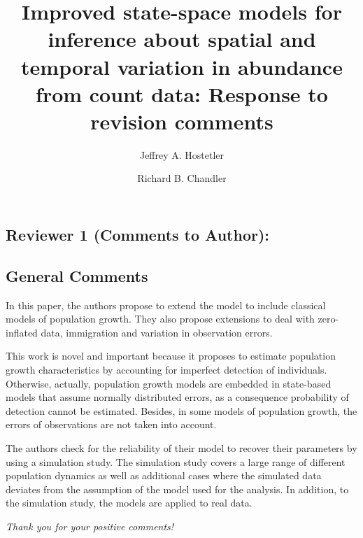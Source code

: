 \documentclass[12pt,english]{article}
\title{Improved state-space models for inference about 
spatial and temporal variation in abundance from count data: Response to revision comments}
\author{Jeffrey A. Hostetler
   \and Richard B. Chandler    
}
\date{}
\begin{document}
\maketitle
\vspace{-1cm}
\begin{spacing}{1.9}
\begin{flushleft}
\renewcommand*\thetable{R\arabic{table}}
\renewcommand*\thefigure{R\arabic{figure}}
\renewcommand*\theequation{R\arabic{equation}}

\section*{Reviewer 1 (Comments to Author):} 
\label{sec:rev1}

\subsection*{General Comments}
In this paper, the authors propose to extend the \citet{dail_madsen:2011} model to 
include classical models of population growth. They also propose extensions to 
deal with zero-inflated data, immigration and variation in observation errors.

This work is novel and important because it proposes to estimate population 
growth characteristics by accounting for imperfect detection of individuals. Otherwise, 
actually, population growth models are embedded in state-based models that assume 
normally distributed errors, as a consequence probability of detection cannot be estimated. 
Besides, in some models of population growth, the errors of observations are not taken 
into account.

The authors check for the reliability of their model to recover their parameters by using a 
simulation study. The simulation study covers a large range of different population 
dynamics as well as additional cases where the simulated data deviates from the assumption 
of the model used for the analysis. In addition, to the simulation study, the models are 
applied to real data.

\vspace{0.5cm}
\textit{Thank you for your positive comments!}
\vspace{0.5cm}


\end{flushleft}
\end{spacing}
\end{document}
